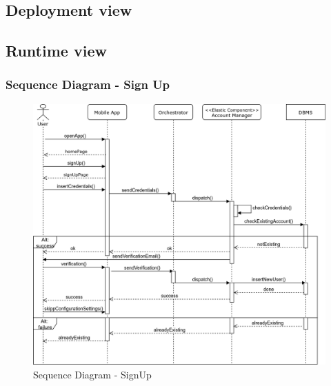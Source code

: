 \subsection{Deployment view}
	
\subsection{Runtime view}
	\label{sect:RuntimeView}
	\subsubsection{Sequence Diagram - Sign Up}
	\label{sect:sd_signUp}
	\begin{figure}[H]
		\centerline{\includegraphics[width=0.9\paperwidth]{Images/signUp}}
		\caption{Sequence Diagram - SignUp}
	\end{figure}
	
